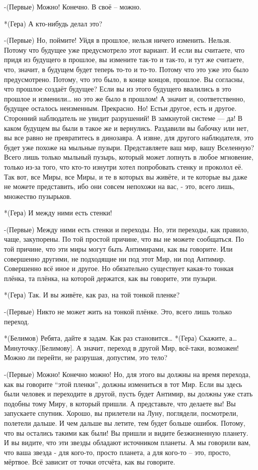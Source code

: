 -(Первые) Можно! Конечно. В своё – можно.

*(Гера) А кто-нибудь делал это?

-(Первые) Но, поймите! Уйдя в прошлое, нельзя ничего изменить. Нельзя. Потому что будущее уже предусмотрело этот вариант. И если вы считаете, что придя из будущего в прошлое, вы измените так-то и так-то, и тут же считаете, что, значит, в будущем будет теперь то-то и то-то. Потому что это уже это было предусмотрено. Потому, что это было, в конце концов, прошлое. Вы согласны, что прошлое создаёт будущее? Если вы из этого будущего ввалились в это прошлое и изменили… но это же было в прошлом! А значит и, соответственно, будущее осталось неизменным. Прекрасно. Но! Естьи другое, есть и другое. Сторонний наблюдатель не увидит разрушений! В замкнутой системе — да! В каком будущем вы были в такое же и вернулись. Раздавили вы бабочку или нет, вы все равно не превратитесь в динозавра. А извне, для другого наблюдателя, это будет уже похоже на мыльные пузыри. Представляете ваш мир, вашу Вселенную? Всего лишь только мыльный пузырь, который может лопнуть в любое мгновение, только из-за того, что кто-то изнутри хотел попробовать стенку и проколол её. Так вот, все Миры, все Миры, и те в которых вы живёте, и те которые вы даже не можете представить, ибо они совсем непохожи на вас, - это, всего лишь, множество пузырьков.

*(Гера) И между ними есть стенки!

-(Первые) Между ними есть стенки и переходы. Но, эти переходы, как правило, чаще, закупорены. По той простой причине, что вы не можете сообщаться. По той причине, что эти миры могут быть Антимирами, как вы говорите. Или совершенно другими, не подходящие ни под этот Мир, ни под Антимир. Совершенно всё иное и другое. Но обязательно существует какая-то тонкая плёнка, та плёнка, на которой держатся, как вы говорите, эти пузыри.

*(Гера) Так. И вы живёте, как раз, на той тонкой пленке?

-(Первые) Никто не может жить на тонкой плёнке. Это, всего лишь только переход.

*(Белимов) Ребята, дайте я задам. Как раз становится…
*(Гера) Скажите, а… Минуточку.[Белимову]. А значит, переход в другой Мир, всё-таки, возможен! Можно ли перейти, не разрушая, допустим, это тело?

-(Первые) Можно! Конечно можно! Но, для этого вы должны на время перехода, как вы говорите “этой пленки”,  должны измениться в тот Мир. Если вы здесь были человек и переходите в другой, пусть будет Антимир, вы должны уже стать подобны тому Миру, в который пришли. А представьте, что делаете вы! Вы запускаете спутник. Хорошо, вы прилетели на Луну, поглядели, посмотрели, полетели дальше. И чем дальше вы летите, тем будет больше ошибок. Потому, что вы остались такими как были! Вы пришли и видите безжизненную планету. И вы видите, что эти звезды обладают источником планеты. А мы говорили вам, что ваша звезда -  для кого-то, просто планета, а для кого-то – это, просто, мёртвое. Всё зависит от точки отсчёта, как вы говорите.

